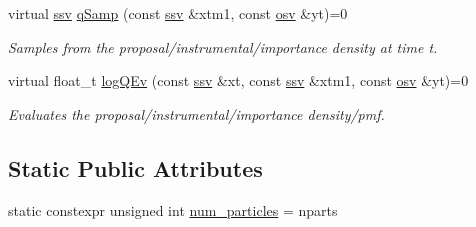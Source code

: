 \begin{DoxyCompactItemize}
virtual \hyperlink{classSISRFilter_ada0fdfca451ed6a22a8bba48a881819d}{ssv} \hyperlink{classSISRFilter_ab953b6fae2c14128f5032854e0ffc62c}{q\+Samp} (const \hyperlink{classSISRFilter_ada0fdfca451ed6a22a8bba48a881819d}{ssv} \&xtm1, const \hyperlink{classSISRFilter_a42325662bf3d057ccc3eaa75fa2f70f9}{osv} \&yt)=0
\begin{DoxyCompactList}\small\item\em Samples from the proposal/instrumental/importance density at time t. \end{DoxyCompactList}\item 
virtual float\+\_\+t \hyperlink{classSISRFilter_ab6a1715a4d8e713d15e8688d40bc6acf}{log\+Q\+Ev} (const \hyperlink{classSISRFilter_ada0fdfca451ed6a22a8bba48a881819d}{ssv} \&xt, const \hyperlink{classSISRFilter_ada0fdfca451ed6a22a8bba48a881819d}{ssv} \&xtm1, const \hyperlink{classSISRFilter_a42325662bf3d057ccc3eaa75fa2f70f9}{osv} \&yt)=0
\begin{DoxyCompactList}\small\item\em Evaluates the proposal/instrumental/importance density/pmf. \end{DoxyCompactList}\end{DoxyCompactItemize}
\subsection*{Static Public Attributes}
\begin{DoxyCompactItemize}
\item 
static constexpr unsigned int \hyperlink{classSISRFilter_a9f5c7aae1c9abf3a1fc8ba371baa8450}{num\+\_\+particles} = nparts
\end{DoxyCompactItemize}

